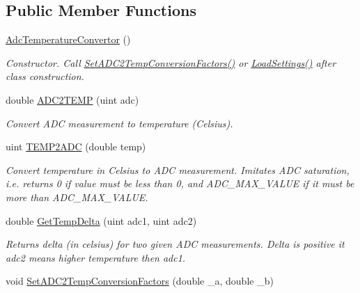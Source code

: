 \subsection*{Public Member Functions}
\begin{DoxyCompactItemize}
\item 
\mbox{\label{class_adc_temperature_convertor_a3a78f66052068b96ace348d55e54d05c}} 
\hyperlink{class_adc_temperature_convertor_a3a78f66052068b96ace348d55e54d05c}{Adc\+Temperature\+Convertor} ()
\begin{DoxyCompactList}\small\item\em Constructor. Call \hyperlink{class_adc_temperature_convertor_a4850843e55992608213cc9cf82d36830}{Set\+A\+D\+C2\+Temp\+Conversion\+Factors()} or \hyperlink{class_adc_temperature_convertor_ac45f10e678aa2f9e25c5351dfd283de0}{Load\+Settings()} after class construction. \end{DoxyCompactList}\item 
double \hyperlink{class_adc_temperature_convertor_a3ee4549435400d9ed319fd5fdb83c97f}{A\+D\+C2\+T\+E\+MP} (uint adc)
\begin{DoxyCompactList}\small\item\em Convert A\+DC measurement to temperature (Celsius). \end{DoxyCompactList}\item 
uint \hyperlink{class_adc_temperature_convertor_ae82f374826a431c837bdf796c593775b}{T\+E\+M\+P2\+A\+DC} (double temp)
\begin{DoxyCompactList}\small\item\em Convert temperature in Celsius to A\+DC measurement. Imitates A\+DC saturation, i.\+e. returns 0 if value must be less than 0, and A\+D\+C\+\_\+\+M\+A\+X\+\_\+\+V\+A\+L\+UE if it must be more than A\+D\+C\+\_\+\+M\+A\+X\+\_\+\+V\+A\+L\+UE. \end{DoxyCompactList}\item 
double \hyperlink{class_adc_temperature_convertor_a6742f0177d4dcd1aab1087b5d7512146}{Get\+Temp\+Delta} (uint adc1, uint adc2)
\begin{DoxyCompactList}\small\item\em Returns delta (in celsius) for two given A\+DC measurements. Delta is positive it adc2 means higher temperature then adc1. \end{DoxyCompactList}\item 
void \hyperlink{class_adc_temperature_convertor_a4850843e55992608213cc9cf82d36830}{Set\+A\+D\+C2\+Temp\+Conversion\+Factors} (double \+\_\+a, double \+\_\+b)

\end{DoxyCompactItemize}
